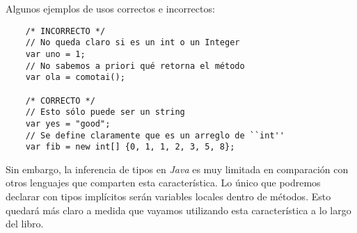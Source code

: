   Algunos ejemplos de usos correctos e incorrectos:

  \begin{verbatim}
    /* INCORRECTO */
    // No queda claro si es un int o un Integer
    var uno = 1;
    // No sabemos a priori qué retorna el método
    var ola = comotai();  

    /* CORRECTO */
    // Esto sólo puede ser un string
    var yes = "good";
    // Se define claramente que es un arreglo de ``int''
    var fib = new int[] {0, 1, 1, 2, 3, 5, 8};
  \end{verbatim}

  Sin embargo, la inferencia de tipos en \textit{Java} es muy limitada en comparación con otros 
  lenguajes que comparten esta característica.
  Lo único que podremos declarar con tipos implícitos serán variables locales dentro de métodos.
  Esto quedará más claro a medida que vayamos utilizando esta característica a lo largo del libro.
